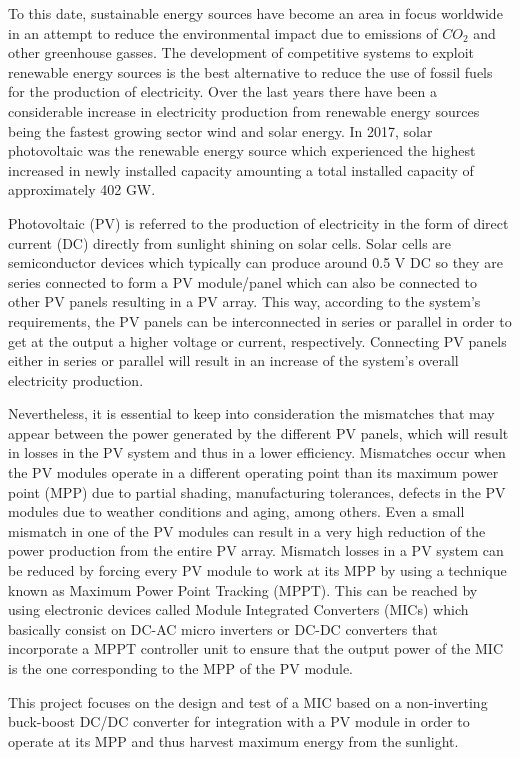 To this date, sustainable energy sources have become an area in focus worldwide in an attempt to reduce the environmental impact due to emissions of $CO_{2}$ and other greenhouse gasses. The development of competitive systems to exploit renewable energy sources is the best alternative to reduce the use of fossil fuels for the production of electricity. Over the last years there have been a considerable increase in electricity production from renewable energy sources being the fastest growing sector wind and solar energy. In 2017, solar photovoltaic was the renewable energy source which experienced the highest increased in newly installed capacity amounting a total installed capacity of approximately 402 GW\cite{global}. %

Photovoltaic (PV) is referred to the production of electricity in the form of direct current (DC) directly from sunlight shining on solar cells. Solar cells are semiconductor devices which typically can produce around 0.5 V DC so they are series connected to form a PV module/panel which can also be connected to other PV panels resulting in a PV array. This way, according to the system's requirements, the PV panels can be interconnected in series or parallel in order to get at the output a higher voltage or current, respectively. Connecting PV panels either in series or parallel will result in an increase of the system's overall electricity production.  %

Nevertheless, it is essential to keep into consideration the mismatches that may appear between the power generated by the different PV panels, which will result in losses in the PV system and thus in a lower efficiency. Mismatches occur when the PV modules operate in a different operating point than its maximum power point (MPP) due to partial shading, manufacturing tolerances, defects in the PV modules due to weather conditions and aging, among others. Even a small mismatch in one of the PV modules can result in a very high reduction of the power production from the entire PV array. Mismatch losses in a PV system can be reduced by forcing every PV module to work at its MPP by using a technique known as Maximum Power Point Tracking (MPPT). This can be reached by using electronic devices called Module Integrated Converters (MICs) which basically consist on DC-AC micro inverters or DC-DC converters that incorporate a MPPT controller unit to ensure that the output power of the MIC is the one corresponding to the MPP of the PV module.%

This project focuses on the design and test of a MIC based on a non-inverting buck-boost DC/DC converter for integration with a PV module in order to operate at its MPP and thus harvest maximum energy from the sunlight. 
